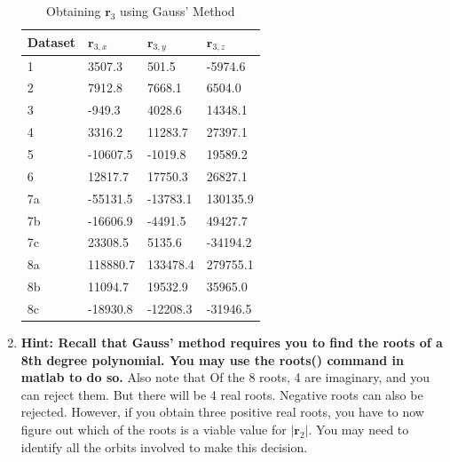 \documentclass[12pt, letterpaper]{aiaa-tc}
\begin{document}
\begin{enumerate}
    \begin{table}[]
        \centering
        \begin{tabular}{|l|lll|}
        \hline
        Dataset & $\bm{r}_{3,x}$                & $\bm{r}_{3,y}$                & $\bm{r}_{3,z}$          \\ \hline
        1       & \multicolumn{1}{l|}{3507.3}   & \multicolumn{1}{l|}{501.5}    & -5974.6  \\ \hline
        2       & \multicolumn{1}{l|}{7912.8}   & \multicolumn{1}{l|}{7668.1}   & 6504.0   \\ \hline
        3       & \multicolumn{1}{l|}{-949.3}   & \multicolumn{1}{l|}{4028.6}   & 14348.1  \\ \hline
        4       & \multicolumn{1}{l|}{3316.2}   & \multicolumn{1}{l|}{11283.7}  & 27397.1  \\ \hline
        5       & \multicolumn{1}{l|}{-10607.5} & \multicolumn{1}{l|}{-1019.8}  & 19589.2  \\ \hline
        6       & \multicolumn{1}{l|}{12817.7}  & \multicolumn{1}{l|}{17750.3}  & 26827.1  \\ \hline
        7a      & \multicolumn{1}{l|}{-55131.5} & \multicolumn{1}{l|}{-13783.1} & 130135.9 \\ \hline
        7b      & \multicolumn{1}{l|}{-16606.9} & \multicolumn{1}{l|}{-4491.5}  & 49427.7  \\ \hline
        7c      & \multicolumn{1}{l|}{23308.5}  & \multicolumn{1}{l|}{5135.6}   & -34194.2 \\ \hline
        8a      & \multicolumn{1}{l|}{118880.7} & \multicolumn{1}{l|}{133478.4} & 279755.1 \\ \hline
        8b      & \multicolumn{1}{l|}{11094.7}  & \multicolumn{1}{l|}{19532.9}  & 35965.0  \\ \hline
        8c      & \multicolumn{1}{l|}{-18930.8} & \multicolumn{1}{l|}{-12208.3} & -31946.5 \\ \hline
        \end{tabular}
        \label{g_m_3}
        \caption{Obtaining $\bm{r}_{3}$ using Gauss' Method}
    \end{table}

    \newpage

    \item \textbf{Hint: Recall that Gauss' method requires you to find the roots of a 8th degree polynomial. You may
    use the roots() command in matlab to do so.} Also note that Of the 8 roots, 4 are imaginary, and you can
    reject them. But there will be 4 real roots. Negative roots can also be rejected. However, if you obtain three
    positive real roots, you have to now figure out which of the roots is a viable value for $|\bm{r}_2|$. You may need to
    identify all the orbits involved to make this decision.
    

\end{enumerate}
\end{document}
